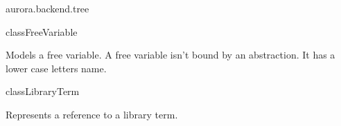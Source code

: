 \begin{texdocpackage}{aurora.backend.tree}
\begin{texdocclass}{class}{FreeVariable}
\label{texdoclet:aurora.backend.tree.FreeVariable}
\begin{texdocclassintro}
Models a free variable. A free variable isn't bound by an abstraction.
 It has a lower case letters name.\end{texdocclassintro}
\begin{texdocclassfields}
\end{texdocclassfields}
\begin{texdocclassconstructors}
\end{texdocclassconstructors}
\begin{texdocclassmethods}
\end{texdocclassmethods}
\end{texdocclass}


\begin{texdocclass}{class}{LibraryTerm}
\label{texdoclet:aurora.backend.tree.LibraryTerm}
\begin{texdocclassintro}
Represents a reference to a library term.\end{texdocclassintro}
\begin{texdocclassfields}
\end{texdocclassfields}
\begin{texdocclassconstructors}
\end{texdocclassconstructors}
\begin{texdocclassmethods}
\end{texdocclassmethods}
\end{texdocclass}



\end{texdocpackage}
